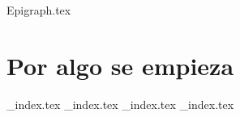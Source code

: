 {Epigraph.tex}
\part{Por algo se empieza}
  {_index.tex}
  {_index.tex}
  {_index.tex}
  {_index.tex}

